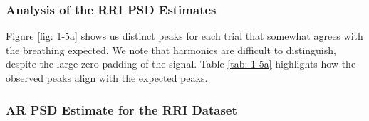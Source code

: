 \documentclass[12pt]{article}
\numberwithin{equation}{section}
\begin{document}
	\subsubsection{Analysis of the RRI PSD Estimates}
	
	Figure \ref{fig: 1-5a} shows us distinct peaks for each trial that somewhat agrees with the breathing expected. We note that harmonics are difficult to distinguish, despite the large zero padding of the signal. Table \ref{tab: 1-5a} highlights how the observed peaks align with the expected peaks.
	\pagebreak
	
	\subsubsection{AR PSD Estimate for the RRI Dataset}
	
\end{document}
